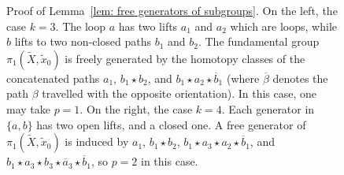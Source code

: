 \documentclass[AHL,Unicode,longabstracts]{cedram}
\begin{document}
\begin{figure}[htbp]
\caption{Proof of Lemma~\ref{lem: free generators of subgroups}. On the left, the case $k=3$. The loop $a$ has two lifts $a_1$ and $a_2$ which are loops, while $b$ lifts to two non-closed paths $b_1$ and $b_2$. The fundamental group $\pi_1(\widetilde{X},\widetilde{x}_0)$ is freely generated by the homotopy classes of the concatenated paths $a_1$, $b_1\star b_2$, and $b_1\star a_2\star \overline{b}_1$ (where $\overline{\beta}$ denotes the path $\beta$ travelled with the opposite orientation). In this case, one may take $p=1$. On the right, the case $k=4$. Each generator in $\{a,b\}$ has two open lifts, and a closed one. A free generator of $\pi_1(\widetilde{X},\widetilde{x}_0)$ is induced by $a_1$, $b_1\star b_2$, $b_1\star a_3\star a_2 \star \overline{b}_1$, and $b_1\star a_3\star b_3 \star \overline{a}_3\star \overline{b}_1 $, so $p=2$ in this case.}
\label{fig: cover}
\end{figure}
\end{document}
